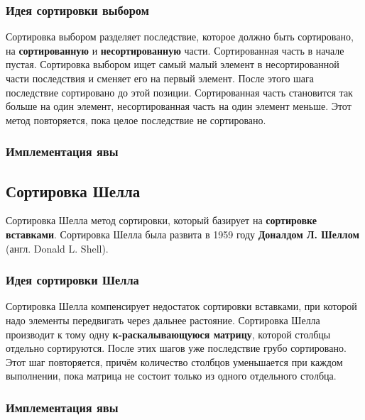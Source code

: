 \documentclass[11pt, a4paper, titlepage, twoside]{article}
\renewcommand{\emph}{\textbf}
\begin{document}
	\subsubsection{Идея сортировки выбором}
	
	Сортировка выбором разделяет последствие, которое должно быть сортировано, на \emph{сортированную} и \emph{несортированную} части. Сортированная часть в начале пустая. Сортировка выбором ищет самый малый элемент в несортированной части последствия и сменяет его на первый элемент. После этого шага последствие сортировано до этой позиции. Сортированная часть становится так больше на один элемент, несортированная часть на один элемент меньше. Этот метод повторяется, пока целое последствие не сортировано.
	
	\subsubsection{Имплементация явы}
	
	
	
	\subsection{Сортировка Шелла}
	
	Сортировка Шелла метод сортировки, который базирует на \emph{сортировке вставками}. Сортировка Шелла была развита в 1959 году \emph{Доналдом Л. Шеллом} (англ. Donald L. Shell).
	
	\subsubsection{Идея сортировки Шелла}
	
	Сортировка Шелла компенсирует недостаток сортировки вставками, при которой надо элементы передвигать через дальнее растояние. Сортировка Шелла производит к тому одну \emph{к-раскалывающуюся матрицу}, которой столбцы отдельно сортируются. После этих шагов уже последствие грубо сортировано. Этот шаг повторяется, причём количество столбцов уменьшается при каждом выполнении, пока матрица не состоит только из одного отдельного столбца.
	
	\subsubsection{Имплементация явы}
	
\end{document}
